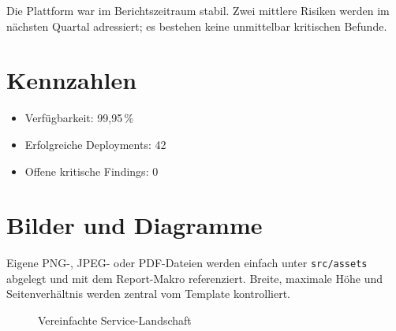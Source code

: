 \documentclass{coolreport}
\begin{document}
\reporttitlepage

\begin{reportsummary}
Die Plattform war im Berichtszeitraum stabil. Zwei mittlere Risiken werden im
nächsten Quartal adressiert; es bestehen keine unmittelbar kritischen Befunde.
\end{reportsummary}

\tableofcontents
\clearpage



\section{Kennzahlen}

\begin{itemize}
  \item Verfügbarkeit: 99,95\,\%
  \item Erfolgreiche Deployments: 42
  \item Offene kritische Findings: 0
\end{itemize}

\section{Bilder und Diagramme}

Eigene PNG-, JPEG- oder PDF-Dateien werden einfach unter
\texttt{src/assets} abgelegt und mit dem Report-Makro referenziert. Breite,
maximale Höhe und Seitenverhältnis werden zentral vom Template kontrolliert.

\begin{figure}[htbp]
  \centering
  \caption{Vereinfachte Service-Landschaft}
\end{figure}
\end{document}
